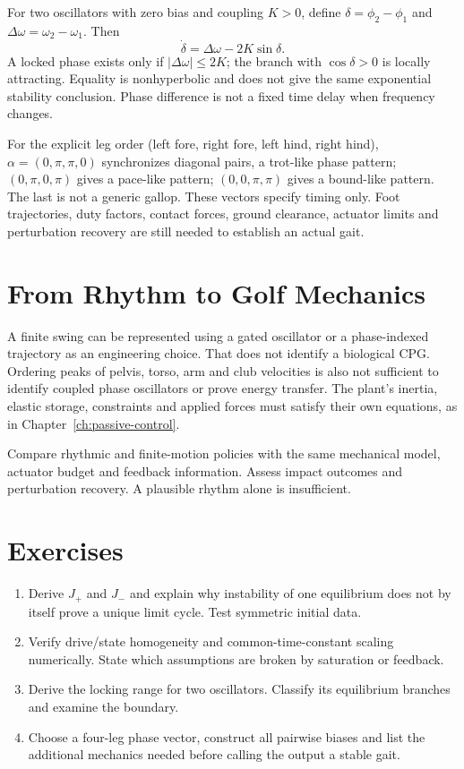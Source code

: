 For two oscillators with zero bias and coupling $K>0$, define
$\delta=\phi_2-\phi_1$ and $\Delta\omega=\omega_2-\omega_1$. Then
\begin{equation}
 \dot\delta=\Delta\omega-2K\sin\delta.
\end{equation}
A locked phase exists only if $|\Delta\omega|\leq2K$; the branch with
$\cos\delta>0$ is locally attracting. Equality is nonhyperbolic and does not
give the same exponential stability conclusion. Phase difference is not a fixed
time delay when frequency changes.

For the explicit leg order (left fore, right fore, left hind, right hind),
$\alpha=(0,\pi,\pi,0)$ synchronizes diagonal pairs, a trot-like phase pattern;
$(0,\pi,0,\pi)$ gives a pace-like pattern; $(0,0,\pi,\pi)$ gives a bound-like
pattern. The last is not a generic gallop. These vectors specify timing only.
Foot trajectories, duty factors, contact forces, ground clearance, actuator
limits and perturbation recovery are still needed to establish an actual gait.

\section{From Rhythm to Golf Mechanics}

A finite swing can be represented using a gated oscillator or a phase-indexed
trajectory as an engineering choice. That does not identify a biological CPG.
Ordering peaks of pelvis, torso, arm and club velocities is also not sufficient
to identify coupled phase oscillators or prove energy transfer. The plant's
inertia, elastic storage, constraints and applied forces must satisfy their own
equations, as in Chapter~\ref{ch:passive-control}.

Compare rhythmic and finite-motion policies with the same mechanical model,
actuator budget and feedback information. Assess impact outcomes and
perturbation recovery. A plausible rhythm alone is insufficient.

\section*{Exercises}
\begin{enumerate}[nosep]
 \item Derive $J_+$ and $J_-$ and explain why instability of one equilibrium
 does not by itself prove a unique limit cycle. Test symmetric initial data.
 \item Verify drive/state homogeneity and common-time-constant scaling
 numerically. State which assumptions are broken by saturation or feedback.
 \item Derive the locking range for two oscillators. Classify its equilibrium
 branches and examine the boundary.
 \item Choose a four-leg phase vector, construct all pairwise biases and
 list the additional mechanics needed before calling the output a stable gait.
\end{enumerate}

